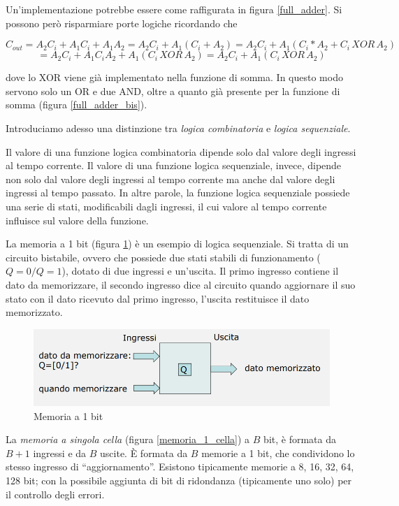 \documentclass{article}
\begin{document}
Un'implementazione potrebbe essere come raffigurata in figura \ref{full_adder}. Si possono però risparmiare porte logiche ricordando che 

\[C_{out} = A_2 C_i + A_1 C_i + A_1 A_2 = A_2 C_i + A_1 (C_i + A_2) =  A_2 C_i + A_1 (C_i * A_2 + C_i \, XOR \, A_2)\] 
\[= A_2 C_i + A_1 C_i A_2 + A_1 (C_i \, XOR \, A_2) = A_2 C_i + A_1 (C_i \, XOR \, A_2)\]

dove lo XOR viene già implementato nella funzione di somma. In questo modo servono solo un OR e due AND, oltre a quanto già presente per la funzione di somma (figura \ref{full_adder_bis}).

\vspace{3mm}

Introduciamo adesso una distinzione tra \textit{logica combinatoria} e \textit{logica sequenziale}.

\vspace{3mm}

Il valore di una funzione logica combinatoria dipende solo dal valore degli ingressi al tempo corrente. Il valore di una funzione logica sequenziale, invece, dipende non solo dal valore degli ingressi al tempo corrente ma anche dal valore degli ingressi al tempo passato. In altre parole, la funzione logica sequenziale possiede una serie di stati, modificabili dagli ingressi, il cui valore al tempo corrente influisce sul valore della funzione.

\vspace{3mm}

La memoria a 1 bit (figura \ref{memoria_1_bit}) è un esempio di logica sequenziale. Si tratta di un circuito bistabile, ovvero che possiede due stati stabili di funzionamento ($Q = 0 / Q = 1$), dotato di due ingressi e un'uscita. Il primo ingresso contiene il dato da memorizzare, il secondo ingresso dice al circuito quando aggiornare il suo stato con il dato ricevuto dal primo ingresso, l'uscita restituisce il dato memorizzato.

\begin{figure}[h]
  \centering
  \includegraphics[scale=0.7]{IM_memoria_1_bit}
  \caption{Memoria a 1 bit}
  \label{memoria_1_bit}
\end{figure}
\clearpage
La \textit{memoria a singola cella} (figura \ref{memoria_1_cella}) a $B$ bit, è formata da $B + 1$ ingressi e da $B$ uscite. È formata da $B$ memorie a 1 bit, che condividono lo stesso ingresso di ``aggiornamento''. Esistono tipicamente memorie a 8, 16, 32, 64, 128 bit; con la possibile aggiunta di bit di ridondanza (tipicamente uno solo) per il controllo degli errori.
\end{document}
